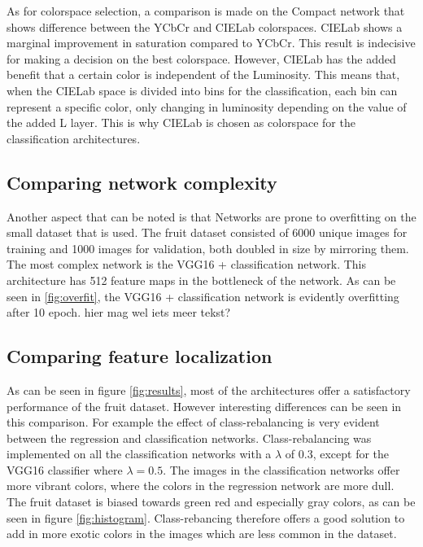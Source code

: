 As for colorspace selection, a comparison is made on the Compact network that shows difference between the YCbCr and CIELab colorspaces. CIELab shows a marginal improvement in saturation compared to YCbCr. This result is indecisive for making a decision on the best colorspace. However, CIELab has the added benefit that a certain color is independent of the Luminosity. This means that, when the CIELab space is divided into bins for the classification, each bin can represent a specific color, only changing in luminosity depending on the value of the added L layer. This is why CIELab is chosen as colorspace for the classification architectures.


\subsection{Comparing network complexity}
Another aspect that can be noted is that Networks are prone to overfitting on the small dataset that is used. The fruit dataset consisted of 6000 unique images for training and 1000 images for validation, both doubled in size by mirroring them. The most complex network is the VGG16 + classification network. This architecture has 512 feature maps in the bottleneck of the network. As can be seen in \ref{fig:overfit}, the VGG16 + classification network is evidently overfitting after 10 epoch. {\color{red} hier mag wel iets meer tekst?}


\subsection{Comparing feature localization}
As can be seen in figure \ref{fig:results}, most of the architectures offer a satisfactory performance of the fruit dataset. However interesting differences can be seen in this comparison. For example the effect of class-rebalancing is very evident between the regression and classification networks. Class-rebalancing was implemented on all the classification networks with a $\lambda$ of 0.3, except for the VGG16 classifier where $\lambda = 0.5$. The images in the classification networks offer more vibrant colors, where the colors in the regression network are more dull. The fruit dataset is biased towards green red and especially gray colors, as can be seen in figure \ref{fig:histogram}. Class-rebancing therefore offers a good solution to add in more exotic colors in the images which are less common in the dataset.

